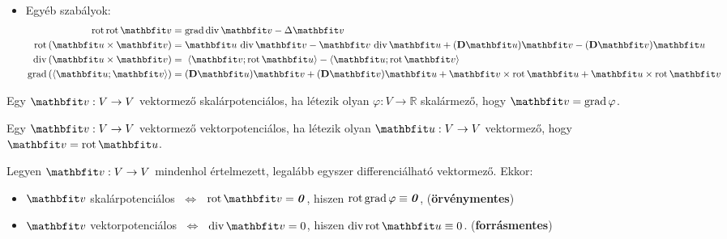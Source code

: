 \documentclass{szb-practice}
\begin{document}
\begin{blueBox}[][nobreak]
\begin{itemize}
    \item Egyéb szabályok:
          \vspace{-.5em}
          \begin{align*}
            \rot \rot \rvec v
             & =\grad \Div \rvec v
            - \Delta \rvec v
            \\
            \rot \left( \rvec u \times \rvec v \right)
             & = \rvec u \, \Div \rvec v
            - \rvec v \, \Div \rvec u
            + (\DD \rvec u) \rvec v
            - (\DD \rvec v) \rvec u
            \\
            \Div \left( \rvec u \times \rvec v \right)
             & = \; \scalar{\rvec v}{\rot \rvec u}
            - \scalar{\rvec u}{\rot \rvec v}
            \\
            \grad \left( \scalar{\rvec u}{\rvec v} \right)
             & = (\DD \rvec u) \rvec v
            + (\DD \rvec v) \rvec u
            + \rvec v \times \rot \rvec u
            + \rvec u \times \rot \rvec v
          \end{align*}
  \end{itemize}
\end{blueBox}

\begin{definition}[Skalárpotenciálosság]
  Egy $\rvec v: V \rightarrow V$ vektormező skalárpotenciálos, ha létezik olyan
  $\varphi: V \rightarrow \mathbb R$ skalármező, hogy $\rvec v = \grad \varphi$.
\end{definition}

\begin{definition}[Vektorpotenciálosság]
  Egy $\rvec v: V \rightarrow V$ vektormező vektorpotenciálos, ha létezik olyan
  $\rvec u: V \rightarrow V$ vektormező, hogy $\rvec v = \rot \rvec u$.
\end{definition}

\begin{theorem}
  Legyen $\rvec v: V \rightarrow V$ mindenhol értelmezett, legalább egyszer
  differenciálható vektormező. Ekkor:
  \begin{itemize}
    \item $\rvec v$ skalárpotenciálos
          $\;\Leftrightarrow\;$
          $\rot \rvec v = \nvec$,
          hiszen $\operatorname{rot} \operatorname{grad} \varphi \equiv \text{\textbf{\textit{0}}}$,
          \hfill (\textbf{örvénymentes})
    \item $\rvec v$ vektorpotenciálos
          $\;\Leftrightarrow\;$
          $\Div \rvec v = 0$,
          hiszen $\Div \rot \rvec u \equiv 0$.
          \hfill (\textbf{forrásmentes})
  \end{itemize}
\end{theorem}
\end{document}
